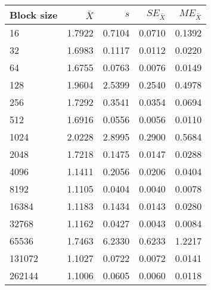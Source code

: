 \begin{tabular}{lrrrr}\toprule
{\small Block size} & $\bar{X}$ & $s$ & $SE_{\bar{X}}$ & $ME_{\bar{X}}$ \\\midrule
16 & 1.7922 & 0.7104 & 0.0710 & 0.1392\\
32 & 1.6983 & 0.1117 & 0.0112 & 0.0220\\
64 & 1.6755 & 0.0763 & 0.0076 & 0.0149\\
128 & 1.9604 & 2.5399 & 0.2540 & 0.4978\\
256 & 1.7292 & 0.3541 & 0.0354 & 0.0694\\
512 & 1.6916 & 0.0556 & 0.0056 & 0.0110\\
1024 & 2.0228 & 2.8995 & 0.2900 & 0.5684\\
2048 & 1.7218 & 0.1475 & 0.0147 & 0.0288\\
4096 & 1.1411 & 0.2056 & 0.0206 & 0.0404\\
8192 & 1.1105 & 0.0404 & 0.0040 & 0.0078\\
16384 & 1.1183 & 0.1434 & 0.0143 & 0.0280\\
32768 & 1.1162 & 0.0427 & 0.0043 & 0.0084\\
65536 & 1.7463 & 6.2330 & 0.6233 & 1.2217\\
131072 & 1.1027 & 0.0722 & 0.0072 & 0.0141\\
262144 & 1.1006 & 0.0605 & 0.0060 & 0.0118\\
\bottomrule
\end{tabular}

